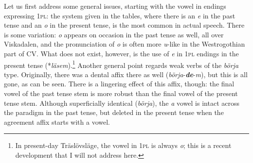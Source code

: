 \documentclass[output=paper,colorlinks,citecolor=brown,draft,draftmode]{langscibook}
\begin{document}
\begin{table}
\caption{\label{tab:petzell:2b}Viskadalian past tense inflection}
\end{table}

Let us first address some general issues, starting with the vowel in endings expressing 1\textsc{pl}: the system given in the tables, where there is an \textit{e} in the past tense and an \textit{o} in the present tense, is the most common in actual speech. There is some variation: \textit{o} appears on occasion in the past tense as well, all over Viskadalen, and the pronunciation of \textit{o} is often more \textit{u}-like in the Westrogothian part of CV. What does not exist, however, is the use of \textit{e} in 1\textsc{pl} endings in the present tense (*\textit{läsem}).\footnote{In present-day Träslövsläge, the vowel in 1\textsc{pl} is always \textit{o}; this is a recent development that I will not address here.} Another general point regards weak verbs of the \textit{börja} type. Originally, there was a dental affix there as well (\textit{börja}-\textbf{\textit{de}}-\textit{m}), but this is all gone, as can be seen. There is a lingering effect of this affix, though: the final vowel of the past tense stem is more robust than the final vowel of the present tense stem. Although superficially identical (\textit{börja}), the \textit{a} vowel is intact across the paradigm in the past tense, but deleted in the present tense when the agreement affix starts with a vowel.
\end{document}
